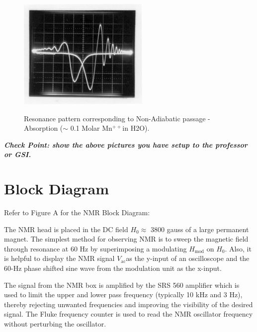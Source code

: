 \documentclass{../lab}
\begin{document}
\begin{figure}[h]
\begin{minipage}[t]{0.31\textwidth}
    \label{fig:AdiabaticDispersion}
\end{minipage}\hfill
\begin{minipage}[t]{0.31\textwidth}
    \href{http://experimentationlab.berkeley.edu/sites/default/files/images/NMR19.gif}{\includegraphics[width=\linewidth]{images/NMR19.png}}
    \caption{Resonance pattern corresponding to Non-Adiabatic passage - Absorption ($\sim$ 0.1 Molar Mn$^{++}$in H2O).}
    \label{fig:NonAdiabaticAbsorption}
\end{minipage}
\end{figure}

\emph{\textbf{Check Point: show the above pictures you have setup to  the professor or GSI.}}

\section{Block Diagram}

Refer to Figure A for the NMR Block Diagram:

The NMR head is placed in the DC field $H_0 \approx$ 3800 gauss of a large permanent magnet. The simplest method for observing NMR is to sweep the magnetic field through resonance at 60 Hz by superimposing a modulating $H_\text{mod}$ on $H_0$. Also, it is helpful to display the NMR signal $V_\text{ac}$as the y-input of an oscilloscope and the 60-Hz phase shifted sine wave from the modulation unit as the x-input.

The signal from the NMR box is amplified by the SRS 560 amplifier which is used to limit the upper and lower pass frequency (typically 10 kHz and 3 Hz), thereby rejecting unwanted frequencies and improving the visibility of the desired signal. The Fluke frequency counter is used to read the NMR oscillator frequency without perturbing the oscillator.
\end{document}
